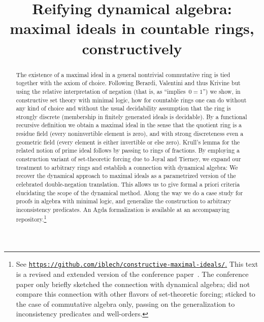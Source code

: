 \documentclass[com,11pt,crcready]{iosart2x}
\theoremstyle{definition}
\theoremstyle{plain}
\theoremstyle{remark}
\renewcommand{\_}{\mathpunct{.}\,}
\begin{document}
\begin{frontmatter}

\title{Reifying dynamical algebra: \\ maximal ideals in countable rings, constructively}

\begin{aug}
\author[A]{
}
\author[B]{
}
\address[A]{Institut für Mathematik, ,
}
\address[B]{Dipartimento di Informatico, ,
}
\end{aug}

\begin{abstract}
  The existence of a maximal ideal in a general nontrivial commutative
  ring is tied together with the axiom of choice.
  Following Berardi, Valentini and thus Krivine but using the relative interpretation of
  negation (that is, as ``implies~$0=1$'') we show, in constructive set theory with
  minimal logic, how for countable rings one can do without any kind of choice
  and without the usual decidability assumption that the ring is strongly
  discrete (membership in finitely generated ideals is decidable).
  By a functional
  recursive definition we obtain a maximal ideal in the sense that the quotient ring is a residue field
  (every noninvertible element is zero), and with strong discreteness
  even a geometric field (every element is either invertible or
  else zero). Krull's lemma for the related notion of prime ideal follows by
  passing to rings of fractions.
  By employing a construction variant of set-theoretic forcing due to Joyal and
  Tierney, we expand our treatment to arbitrary rings and establish a
  connection with dynamical algebra: We
  recover the dynamical approach to maximal ideals as a parametrized version of the
  celebrated double-negation translation. This allows us to give formal a priori criteria
  elucidating the scope of the dynamical method.
  Along the way we do a case study for proofs in algebra with minimal logic,
  and generalize the construction to arbitrary inconsistency predicates. An Agda
  formalization is available at an accompanying repository.\footnote{See
  \href{https://github.com/iblech/constructive-maximal-ideals/}{\texttt{https:/$\!$/github.com/iblech/constructive-maximal-ideals/}.}
  This text is a revised and extended version
  of the conference paper~\cite{blechschmidt-schuster:constructive-maximal-ideals}. The conference paper only
  briefly sketched the connection with dynamical algebra; did not compare this
  connection with other flavors of set-theoretic forcing; sticked to the case
  of commutative algebra only, passing on the generalization to inconsistency predicates
  and well-orders.}
\end{abstract}


\end{frontmatter}
\end{document}
